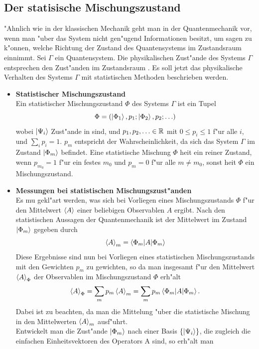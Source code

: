   \subsection{Der statisische Mischungszustand} 
    "Ahnlich wie in der klassischen Mechanik geht man in der Quantenmechanik vor, wenn man "uber das System nicht gen"ugend Informationen besitzt, um sagen zu 
    k"onnen, welche Richtung der Zustand des Quantensystems im Zustandsraum \raum{} einnimmt. 
    Sei $\Gamma$ ein Quantensystem. Die physikalischen Zust"ande des Systems $\Gamma$ entsprechen den Zust"anden im Zustandsraum \raum. Es soll jetzt das
    physikalische Verhalten des Systems $\Gamma$ mit statistischen Methoden beschrieben werden.
    \begin{itemize}
      \item[(i)]{\bf Statistischer Mischungszustand} \\
        Ein statistischer Mischungszustand $\Phi$ des Systems $\Gamma$ ist ein Tupel
        $$ \Phi = \left( \left| \Phi_1 \right>, p_1 ;\left| \Phi_2 \right>, p_2 ;\ldots \right) $$
        wobei $\left| \Psi_i \right>$ Zust"ande in \raum{} sind, und $p_1 , p_2 ,\ldots \in \mathbb{R}$ mit $0 \le p_i \le 1$ f"ur alle $i$, und $\sum_i p_i = 1$.
        $p_m$ entspricht der Wahrscheinlichkeit, da\3 sich das System $\Gamma$ im Zustand $\left| \Phi_m \right>$ befindet.
        Eine statistische Mischung $\Phi$ hei\3t ein reiner Zustand, wenn $p_{m_0} = 1$ f"ur ein festes $m_0$ und $p_m = 0$ f"ur alle $m \neq m_0$, sonst hei\3t
        $\Phi$ ein Mischungszustand.
      \item[(ii)]{\bf Messungen bei statistischen Mischungszust"anden} \\
        Es mu\3 gekl"art werden, was sich bei Vorliegen eines Mischungszustands $\Phi$ f"ur den Mittelwert $\left< A \right>$ einer beliebigen Observablen $A$ ergibt. Nach den 
        statistischen Aussagen der Quantenmechanik ist der Mittelwert im Zustand $\left| \Phi_m \right>$ gegeben durch
        $$ \left< A \right>_m = \left< \Phi_m | A | \Phi_m \right> $$
        Diese Ergebnisse sind nun bei Vorliegen eines statistischen Mischungszustands mit den Gewichten $p_m$ zu gewichten, so da\3 man insgesamt f"ur den
        Mittelwert
        $\left< A \right>_{\Phi}$ der Observablen im Mischungszustand $\Phi$ erh"alt
        $$ \left< A \right>_{\Phi} = \sum_m p_m \left< A \right>_m = \sum_m p_m \left< \Phi_m | A | \Phi_m \right>. $$
        Dabei ist zu beachten, da\3 man die Mittelung "uber die statistische Mischung in den Mittelwerten $\left< A \right>_m$ ausf"uhrt. \\
        Entwickelt man die Zust"ande $\left| \Phi_m \right>$ nach einer Basis $\left\{ \left| \Psi_i \right> \right\}$, die zugleich die einfachen Einheitsvektoren des Operators A sind, so erh"alt man

\end{itemize}
